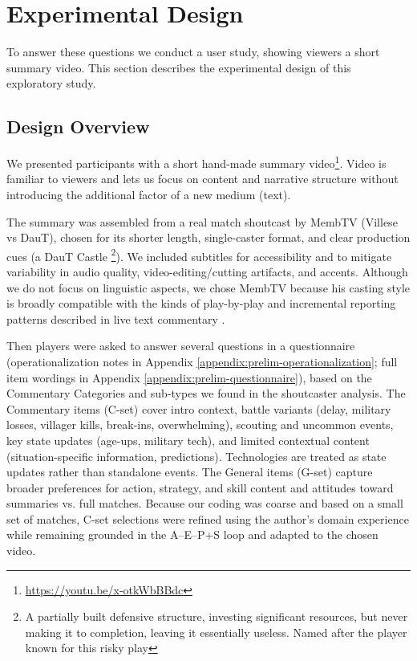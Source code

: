 \section{Experimental Design}
To answer these questions we conduct a user study, showing viewers a short summary video. This section describes the experimental design of this exploratory study.

\subsection{Design Overview}
We presented participants with a short hand-made summary video\footnote{\url{https://youtu.be/x-otkWbBBdc}}. Video is familiar to viewers and lets us focus on content and narrative structure without introducing the additional factor of a new medium (text).

The summary was assembled from a real match shoutcast by MembTV (Villese vs DauT), chosen for its shorter length, single-caster format, and clear production cues (a DauT Castle \footnote{A partially built defensive structure, investing significant resources, but never making it to completion, leaving it essentially useless. Named after the player known for this risky play}). We included subtitles for accessibility and to mitigate variability in audio quality, video-editing/cutting artifacts, and accents. Although we do not focus on linguistic aspects, we chose MembTV because his casting style is broadly compatible with the kinds of play-by-play and incremental reporting patterns described in live text commentary \cite{lewandowski2012, pavzanin2022}.

Then players were asked to answer several questions in a questionnaire (operationalization notes in Appendix \ref{appendix:prelim-operationalization}; full item wordings in Appendix \ref{appendix:prelim-questionnaire}), based on the Commentary Categories and sub-types we found in the shoutcaster analysis. The Commentary items (C-set) cover intro context, battle variants (delay, military losses, villager kills, break-ins, overwhelming), scouting and uncommon events, key state updates (age-ups, military tech), and limited contextual content (situation-specific information, predictions). Technologies are treated as state updates rather than standalone events. The General items (G-set) capture broader preferences for action, strategy, and skill content and attitudes toward summaries vs. full matches. Because our coding was coarse and based on a small set of matches, C-set selections were refined using the author’s domain experience while remaining grounded in the A–E–P+S loop and adapted to the chosen video.

